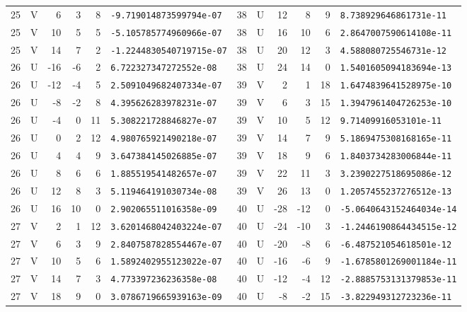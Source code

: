 \begin{longtable}{rcrrrl|rcrrrl}
25 & V & 6 & 3 & 8 & \texttt{-9.719014873599794e-07} & 38 & U & 12 & 8 & 9 & \texttt{8.738929646861731e-11}\\
25 & V & 10 & 5 & 5 & \texttt{-5.105785774960966e-07} & 38 & U & 16 & 10 & 6 & \texttt{2.8647007590614108e-11}\\
25 & V & 14 & 7 & 2 & \texttt{-1.2244830540719715e-07} & 38 & U & 20 & 12 & 3 & \texttt{4.588080725546731e-12}\\
26 & U & -16 & -6 & 2 & \texttt{6.722327347272552e-08} & 38 & U & 24 & 14 & 0 & \texttt{1.5401605094183694e-13}\\
26 & U & -12 & -4 & 5 & \texttt{2.5091049682407334e-07} & 39 & V & 2 & 1 & 18 & \texttt{1.6474839641528975e-10}\\
26 & U & -8 & -2 & 8 & \texttt{4.395626283978231e-07} & 39 & V & 6 & 3 & 15 & \texttt{1.3947961404726253e-10}\\
26 & U & -4 & 0 & 11 & \texttt{5.308221728846827e-07} & 39 & V & 10 & 5 & 12 & \texttt{9.71409916053101e-11}\\
26 & U & 0 & 2 & 12 & \texttt{4.980765921490218e-07} & 39 & V & 14 & 7 & 9 & \texttt{5.1869475308168165e-11}\\
26 & U & 4 & 4 & 9 & \texttt{3.647384145026885e-07} & 39 & V & 18 & 9 & 6 & \texttt{1.8403734283006844e-11}\\
26 & U & 8 & 6 & 6 & \texttt{1.885519541482657e-07} & 39 & V & 22 & 11 & 3 & \texttt{3.2390227518695086e-12}\\
26 & U & 12 & 8 & 3 & \texttt{5.119464191030734e-08} & 39 & V & 26 & 13 & 0 & \texttt{1.2057455237276512e-13}\\
26 & U & 16 & 10 & 0 & \texttt{2.902065511016358e-09} & 40 & U & -28 & -12 & 0 & \texttt{-5.0640643152464034e-14}\\
27 & V & 2 & 1 & 12 & \texttt{3.6201468042403224e-07} & 40 & U & -24 & -10 & 3 & \texttt{-1.2446190864434515e-12}\\
27 & V & 6 & 3 & 9 & \texttt{2.8407587828554467e-07} & 40 & U & -20 & -8 & 6 & \texttt{-6.487521054618501e-12}\\
27 & V & 10 & 5 & 6 & \texttt{1.5892402955123022e-07} & 40 & U & -16 & -6 & 9 & \texttt{-1.6785801269001184e-11}\\
27 & V & 14 & 7 & 3 & \texttt{4.773397236236358e-08} & 40 & U & -12 & -4 & 12 & \texttt{-2.8885753131379853e-11}\\
27 & V & 18 & 9 & 0 & \texttt{3.0786719665939163e-09} & 40 & U & -8 & -2 & 15 & \texttt{-3.822949312723236e-11}\\

\end{longtable}
